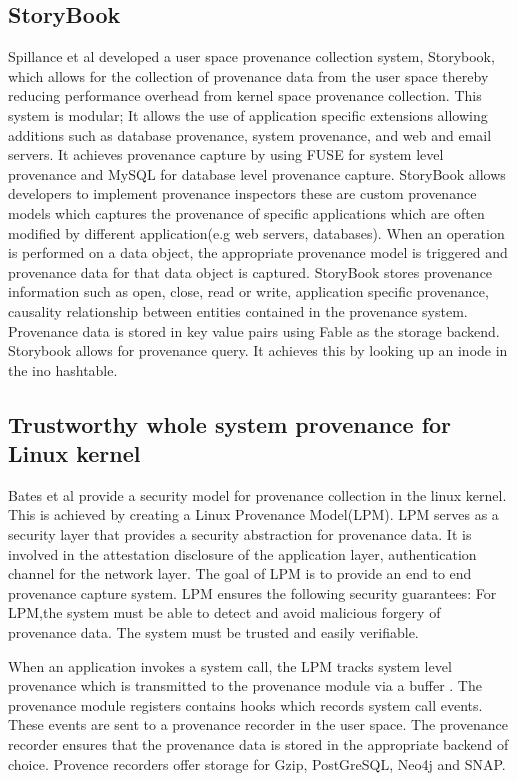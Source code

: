 \subsection{StoryBook}
Spillance et al \cite{story} developed a user space provenance collection system, Storybook, which allows for the collection of provenance data from the user space thereby reducing performance overhead from kernel space provenance collection. This system is modular; It allows the use of application specific extensions allowing additions such as database provenance, system provenance, and web and email servers. It achieves provenance capture by using FUSE for system level provenance and MySQL for database level provenance capture. StoryBook allows developers to implement provenance inspectors these are custom provenance models which captures the provenance of specific applications which are often modified by different application(e.g web servers, databases). When an operation is performed on a data object, the appropriate provenance model is triggered and provenance data for that data object is captured. StoryBook stores provenance information such as open, close, read or write, application specific provenance, causality relationship between entities contained in the provenance system. Provenance data is stored in key value pairs using Fable as the storage backend. Storybook allows for provenance query. It achieves this by looking up an inode in the ino hashtable.



\subsection{Trustworthy whole system provenance for Linux kernel}

Bates et al \cite{bates_towards_2013} provide a security model for provenance collection in the linux kernel. This is achieved by creating a Linux Provenance Model(LPM). LPM serves as a security layer that provides a security abstraction for provenance data. It is involved in the attestation disclosure of the application layer, authentication channel for the network layer. The goal of LPM is to provide an end to end provenance capture system. LPM ensures the following security guarantees: For LPM,the system must be able to detect and avoid malicious forgery of provenance data. The system must be trusted and easily verifiable. \par When an application invokes a system call, the LPM tracks system level provenance which is transmitted to the provenance module via a buffer . The provenance module registers contains hooks which records system call events. These events are sent to a provenance recorder in the user space. The provenance recorder ensures that the provenance data is stored in the appropriate backend of choice. Provence recorders offer storage for Gzip, PostGreSQL, Neo4j and SNAP.



